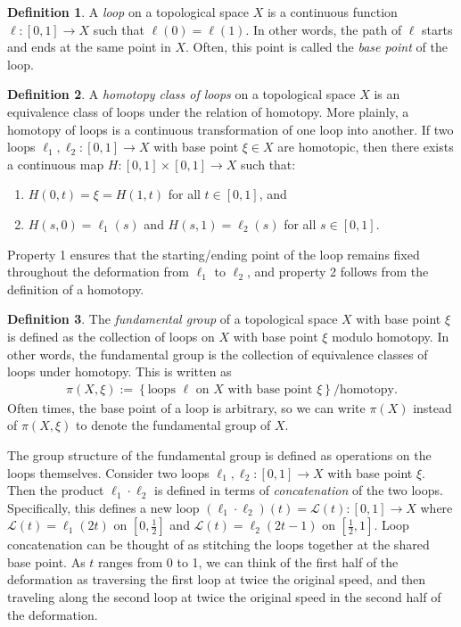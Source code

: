 \documentclass[12pt]{report}
\theoremstyle{definition}
\newtheorem{definition}{Definition}[chapter]
\begin{document}
\begin{definition}
    A \textit{loop} on a topological space $X$ is a continuous function $\ell:[0,1]\to X$ such that $\ell(0) = \ell(1)$. In other words, the path of $\ell$ starts and ends at the same point in $X$. Often, this point is called the \textit{base point} of the loop.
\end{definition}

\begin{definition}
    A \textit{homotopy class of loops} on a topological space $X$ is an equivalence class of loops under the relation of homotopy. More plainly, a homotopy of loops is a continuous transformation of one loop into another. If two loops $\ell_1,\ell_2:[0,1]\to X$ with base point $\xi\in X$ are homotopic, then there exists a continuous map $H:[0,1]\times [0,1]\to X$ such that:
    \begin{enumerate}
        \item $H(0,t) = \xi = H(1,t)$ for all $t\in [0,1]$, and
        \item $H(s,0) = \ell_1(s)$ and $H(s,1) = \ell_2(s)$ for all $s\in [0,1]$.
    \end{enumerate}
    Property 1 ensures that the starting/ending point of the loop remains fixed throughout the deformation from $\ell_1$ to $\ell_2$, and property 2 follows from the definition of a homotopy.
\end{definition}

\begin{definition}
    The \textit{fundamental group} of a topological space $X$ with base point $\xi$ is defined as the collection of loops on $X$ with base point $\xi$ modulo homotopy. In other words, the fundamental group is the collection of equivalence classes of loops under homotopy. This is written as
    \begin{align*}
        \pi(X,\xi):=\left\{ \textrm{loops }\ell \textrm{ on }X \textrm{ with base point }\xi \right\}/\textrm{homotopy}.
    \end{align*}
    Often times, the base point of a loop is arbitrary, so we can write $\pi(X)$ instead of $\pi(X,\xi)$ to denote the fundamental group of $X$.
\end{definition}

The group structure of the fundamental group is defined as operations on the loops themselves. Consider two loops $\ell_1,\ell_2:[0,1]\to X$ with base point $\xi$. Then the product $\ell_1\cdot\ell_2$ is defined in terms of \textit{concatenation} of the two loops. Specifically, this defines a new loop $(\ell_1\cdot\ell_2)(t)=\mathcal{L}(t):[0,1]\to X$ where $\mathcal{L}(t) = \ell_1(2t)$ on $\left[ 0,\frac{1}{2} \right]$ and $\mathcal{L}(t) = \ell_2(2t-1)$ on $\left[ \frac{1}{2},1 \right]$. Loop concatenation can be thought of as stitching the loops together at the shared base point. As $t$ ranges from 0 to 1, we can think of the first half of the deformation as traversing the first loop at twice the original speed, and then traveling along the second loop at twice the original speed in the second half of the deformation. 
\end{document}
